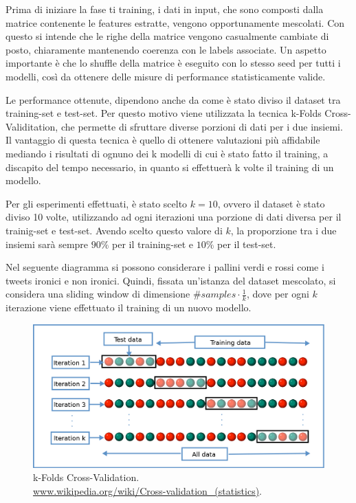 \documentclass[oneside]{book}
\begin{document}
Prima di iniziare la fase ti training, i dati in input, che sono composti dalla matrice contenente le features estratte, vengono opportunamente mescolati. Con questo si intende che le righe della matrice vengono casualmente cambiate di posto, chiaramente mantenendo coerenza con le labels associate. Un aspetto importante è che lo shuffle della matrice è eseguito con lo stesso seed per tutti i modelli, così da ottenere delle misure di performance statisticamente valide.

Le performance ottenute, dipendono anche da come è stato diviso il dataset tra training-set e test-set. Per questo motivo viene utilizzata la tecnica k-Folds Cross-Validitation, che permette di sfruttare diverse porzioni di dati per i due insiemi. Il vantaggio di questa tecnica è quello di ottenere valutazioni più affidabile mediando i risultati di ognuno dei k modelli di cui è stato fatto il training, a discapito del tempo necessario, in quanto si effettuerà k volte il training di un modello.

Per gli esperimenti effettuati, è stato scelto $k=10$, ovvero il dataset è stato diviso 10 volte, utilizzando ad ogni iterazioni una porzione di dati diversa per il trainig-set e test-set. Avendo scelto questo valore di $k$, la proporzione tra i due insiemi sarà sempre $90\%$ per il training-set e $10\%$ per il test-set.

Nel seguente diagramma si possono considerare i pallini verdi e rossi come i tweets ironici e non ironici. Quindi, fissata un'istanza del dataset mescolato, si considera una sliding window di dimensione $\#samples \cdot \frac{1}{k}$, dove per ogni $k$ iterazione viene effettuato il training di un nuovo modello.

\begin{figure}[!h]
	\centering
	\includegraphics[width=13cm]{assets/cross-validation.png}
	\caption{k-Folds Cross-Validation. \\ \url{www.wikipedia.org/wiki/Cross-validation_(statistics)}.}
	\label{fig:cross-validation}
\end{figure}
\end{document}
